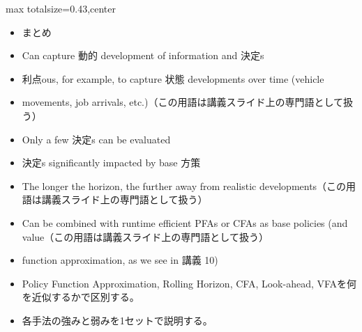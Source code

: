 \clearpage
{}
\begin{minipage}[t]{0.405\textwidth}
\begin{adjustbox}{max totalsize={\textwidth}{0.43\textheight},center}
\begin{minipage}{\textwidth}\scriptsize
{}\begin{itemize}
\item まとめ
\item Can capture 動的 development of information and 決定s
\item 利点ous, for example, to capture 状態 developments over time (vehicle
\item movements, job arrivals, etc.)（この用語は講義スライド上の専門語として扱う）
\item Only a few 決定s can be evaluated
\item 決定s significantly impacted by base 方策
\item The longer the horizon, the further away from realistic developments（この用語は講義スライド上の専門語として扱う）
\item Can be combined with runtime efficient PFAs or CFAs as base policies (and value（この用語は講義スライド上の専門語として扱う）
\item function approximation, as we see in 講義 10)
\end{itemize}\begin{itemize}
\item Policy Function Approximation, Rolling Horizon, CFA, Look-ahead, VFAを何を近似するかで区別する。
\item 各手法の強みと弱みを1セットで説明する。
\end{itemize}
\end{minipage}
\end{adjustbox}
\end{minipage}\hfill

